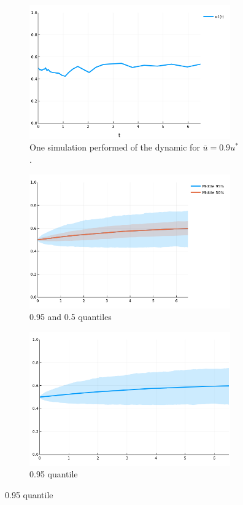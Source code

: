 \begin{figure}[H]
	\caption{Noise Tolerant Harvesting.}
	\begin{center}
		\begin{subfigure}{0.3\textwidth}
			\includegraphics[width=0.95\textwidth]{NoisePresenceDynamic.png}
			\caption{One simulation performed of the dynamic for $\bar{u}=0.9u^*$.}
		\end{subfigure}
		\begin{subfigure}{0.3\textwidth}
		\includegraphics[width=0.95\textwidth]{SmarterNoiseTolerant2.png}
		\caption{0.95 and 0.5 quantiles}
		\end{subfigure}
		\begin{subfigure}{0.3\textwidth}
			\includegraphics[width=0.95\textwidth]{SmarterNoiseTolerant.png}
			\caption{0.95 quantile}
		\end{subfigure}
	\end{center}
\end{figure}